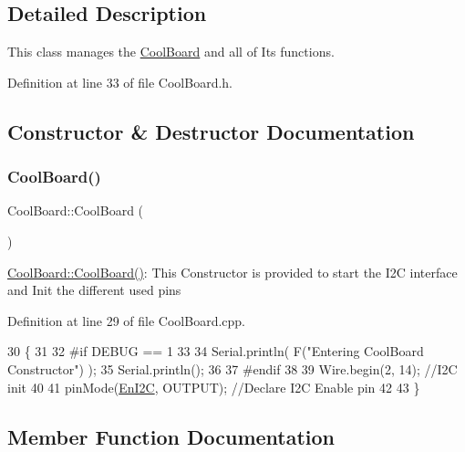 \subsection{Detailed Description}
This class manages the \hyperlink{class_cool_board}{Cool\+Board} and all of Its functions. 

Definition at line 33 of file Cool\+Board.\+h.



\subsection{Constructor \& Destructor Documentation}
\mbox{\label{class_cool_board_a8b88fd781e22e93025dd63474113b7e4}} 
\subsubsection{\texorpdfstring{Cool\+Board()}{CoolBoard()}}
{\footnotesize\ttfamily Cool\+Board\+::\+Cool\+Board (\begin{DoxyParamCaption}{ }\end{DoxyParamCaption})}

\hyperlink{class_cool_board_a8b88fd781e22e93025dd63474113b7e4}{Cool\+Board\+::\+Cool\+Board()}\+: This Constructor is provided to start the I2C interface and Init the different used pins 

Definition at line 29 of file Cool\+Board.\+cpp.


\begin{DoxyCode}
30 \{
31 
32 \textcolor{preprocessor}{#if DEBUG == 1}
33 
34     Serial.println( F(\textcolor{stringliteral}{"Entering CoolBoard Constructor"}) );
35     Serial.println();
36 
37 \textcolor{preprocessor}{#endif}
38     
39     Wire.begin(2, 14);                       \textcolor{comment}{//I2C init }
40 
41     pinMode(\hyperlink{class_cool_board_af1fe1376fc66f93dee80b327ca695377}{EnI2C}, OUTPUT);           \textcolor{comment}{//Declare I2C Enable pin }
42 
43 \}
\end{DoxyCode}


\subsection{Member Function Documentation}
\mbox{\label{class_cool_board_acba7c5aef7268b2c0044bdb54d3b9d76}} 
